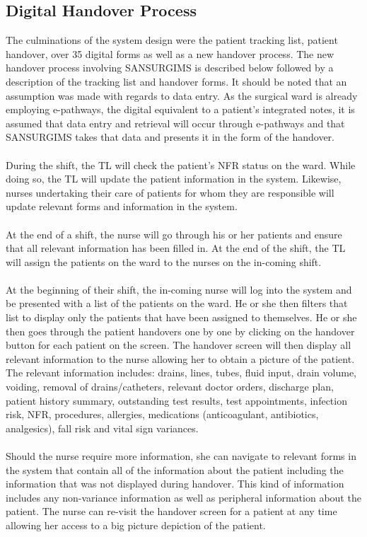\subsection{Digital Handover Process}
\label{Digital Handover Process}
The culminations of the system design were the patient tracking list, patient handover, over 35 digital forms as well as a new handover process. The new handover process involving SANSURGIMS is described below followed by a description of the tracking list and handover forms. It should be noted that an assumption was made with regards to data entry. As the surgical ward is already employing e-pathways, the digital equivalent to a patient's integrated notes, it is assumed that data entry and retrieval will occur through e-pathways and that SANSURGIMS takes that data and presents it in the form of the handover.
\\ \\
During the shift, the TL will check the patient's NFR status on the ward. While doing so, the TL will update the patient information in the system. Likewise, nurses undertaking their care of patients for whom they are responsible will update relevant forms and information in the system. 
\\ \\
At the end of a shift, the nurse will go through his or her patients and ensure that all relevant information has been filled in. At the end of the shift, the TL will assign the patients on the ward to the nurses on the in-coming shift.
\\ \\
At the beginning of their shift, the in-coming nurse will log into the system and be presented with a list of the patients on the ward. He or she then filters that list to display only the patients that have been assigned to themselves. He or she then goes through the patient handovers one by one by clicking on the handover button for each patient on the screen. The handover screen will then display all relevant information to the nurse allowing her to obtain a picture of the patient. The relevant information includes: drains, lines, tubes, fluid input, drain volume, voiding, removal of drains/catheters, relevant doctor orders, discharge plan, patient history summary, outstanding test results, test appointments, infection risk, NFR, procedures, allergies, medications (anticoagulant, antibiotics, analgesics), fall risk and vital sign variances. 
\\ \\
Should the nurse require more information, she can navigate to relevant forms in the system that contain all of the information about the patient including the information that was not displayed during handover. This kind of information includes any non-variance information as well as peripheral information about the patient. The nurse can re-visit the handover screen for a patient at any time allowing her access to a big picture depiction of the patient.

